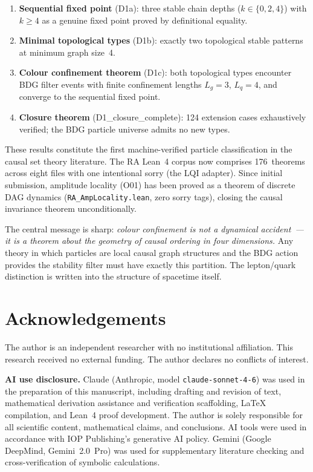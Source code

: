 \documentclass[11pt,a4paper]{article}
\begin{document}
\begin{enumerate}
  \item \textbf{Sequential fixed point} (D1a): three stable chain depths
    ($k \in \{0,2,4\}$) with $k \geq 4$ as a genuine fixed point proved
    by definitional equality.
  \item \textbf{Minimal topological types} (D1b): exactly two topological
    stable patterns at minimum graph size~4.
  \item \textbf{Colour confinement theorem} (D1c): both topological types
    encounter BDG filter events with finite confinement lengths $L_g=3$,
    $L_q=4$, and converge to the sequential fixed point.
  \item \textbf{Closure theorem} (D1\_closure\_complete): 124 extension
    cases exhaustively verified; the BDG particle universe admits no new
    types.
\end{enumerate}

These results constitute the first machine-verified particle classification
in the causal set theory literature. The RA Lean~4 corpus now comprises
176~theorems across eight files with one intentional sorry (the LQI adapter).
Since initial submission, amplitude locality (O01) has been proved as a theorem
of discrete DAG dynamics (\texttt{RA\_AmpLocality.lean}, zero sorry tags),
closing the causal invariance theorem unconditionally.

The central message is sharp: \emph{colour confinement is not a dynamical
accident~--- it is a theorem about the geometry of causal ordering in four
dimensions.} Any theory in which particles are local causal graph structures
and the BDG action provides the stability filter must have exactly this
partition. The lepton/quark distinction is written into the structure of
spacetime itself.



\medskip


\section*{Acknowledgements}

The author is an independent researcher with no institutional affiliation.
This research received no external funding.
The author declares no conflicts of interest.

\smallskip\noindent
\textbf{AI use disclosure.}
Claude (Anthropic, model \texttt{claude-sonnet-4-6}) was used in the
preparation of this manuscript, including drafting and revision of text,
mathematical derivation assistance and verification scaffolding,
\LaTeX{} compilation, and Lean~4 proof development.
The author is solely responsible for all scientific content,
mathematical claims, and conclusions.
AI tools were used in accordance with IOP Publishing's generative AI policy.
Gemini (Google DeepMind, Gemini~2.0~Pro) was used for supplementary
literature checking and cross-verification of symbolic calculations.
\end{document}
